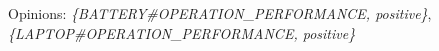     Opinions: \textit{\{BATTERY\#OPERATION\_PERFORMANCE, positive\}}, \\
    
    \textit{\{LAPTOP\#OPERATION\_PERFORMANCE, positive\}}\\